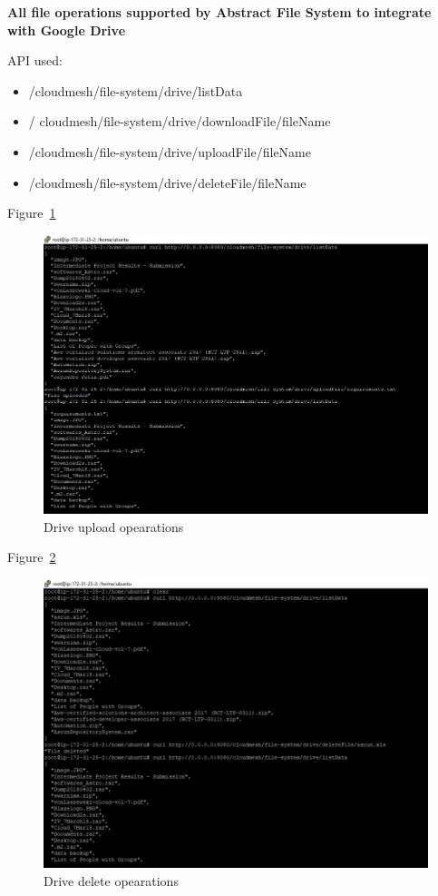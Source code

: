 \textbf{All file operations supported by Abstract File System to integrate 
with Google Drive}


API used:
\begin{itemize}

    \item /cloudmesh/file-system/drive/listData
    \item / cloudmesh/file-system/drive/downloadFile/{fileName}
    \item /cloudmesh/file-system/drive/uploadFile/{fileName}
    \item /cloudmesh/file-system/drive/deleteFile/{fileName}

\end{itemize}

Figure~\ref{fig:drive-upload}

\begin{figure}[!ht]
        \centering\includegraphics[width=\columnwidth]
        {image/drive-upload.JPG}
        \caption{Drive upload opearations}\label{fig:drive-upload}
\end{figure}


Figure~\ref{fig:drive-delete}

\begin{figure}[!ht]
        \centering\includegraphics[width=\columnwidth]
        {image/drive-delete.JPG}
        \caption{Drive delete opearations}\label{fig:drive-delete}
\end{figure}



